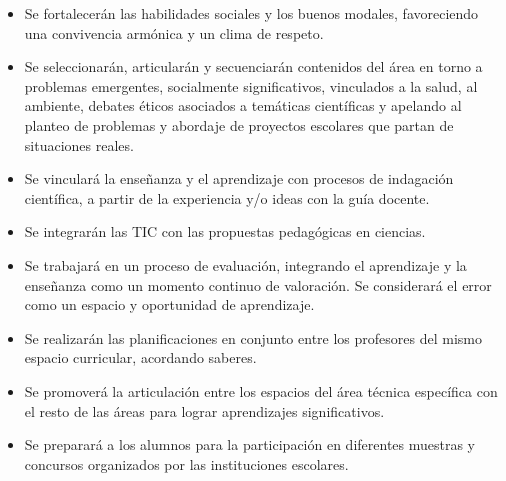 \documentclass[../main]{subfiles}
\begin{document}
\begin{itemize}
\item Se fortalecerán las habilidades sociales y los buenos modales, favoreciendo una convivencia armónica y un clima de respeto. 

\item Se seleccionarán, articularán y secuenciarán contenidos del área en torno a problemas emergentes, socialmente significativos, vinculados a la salud, al ambiente, debates éticos asociados a temáticas científicas y apelando al planteo de problemas y abordaje de proyectos escolares que partan de situaciones reales. 

\item Se vinculará la enseñanza y el aprendizaje con procesos de indagación científica, a partir de la experiencia y/o ideas con la guía docente. 

\item Se integrarán las TIC con las propuestas pedagógicas en ciencias. 

\item Se trabajará en un proceso de evaluación, integrando el aprendizaje y la enseñanza como un momento continuo de valoración. Se considerará el error como un espacio y oportunidad de aprendizaje. 

\item Se realizarán las planificaciones en conjunto entre los profesores del mismo espacio curricular, acordando saberes. 

\item Se promoverá la articulación entre los espacios del área técnica específica con el resto de las áreas para lograr aprendizajes significativos.  

\item Se preparará a los alumnos para la participación en diferentes muestras y concursos organizados por las instituciones escolares. 

\end{itemize}

\newpage
\end{document}
